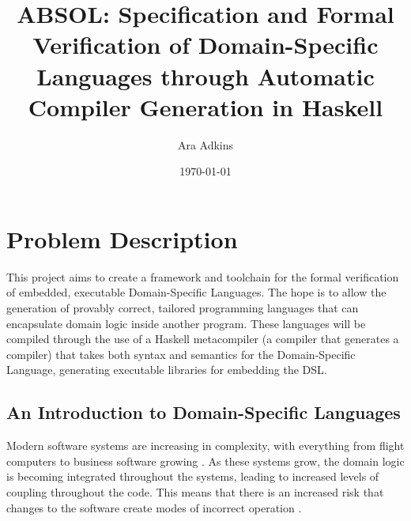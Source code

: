 \documentclass[a4paper,11pt]{report}
\title{ABSOL: Specification and Formal Verification of Domain-Specific Languages through Automatic Compiler Generation in Haskell}
\author{Ara Adkins}
\date{\today}
\begin{document}
\maketitle

\tableofcontents

\printglossaries

\chapter{Problem Description} %
\label{cha:problem_description}
This project aims to create a framework and toolchain for the formal verification of embedded, executable Domain-Specific Languages.
The hope is to allow the generation of provably correct, tailored programming languages that can encapsulate domain logic inside another program.
These languages will be compiled through the use of a Haskell metacompiler (a compiler that generates a compiler) that takes both syntax and semantics for the Domain-Specific Language, generating executable libraries for embedding the DSL.

\section{An Introduction to Domain-Specific Languages} %
\label{sec:an_introduction_to_domain_specific_languages}
Modern software systems are increasing in complexity, with everything from flight computers to business software growing \citep{dvorak2009nasa}.
As these systems grow, the domain logic is becoming integrated throughout the systems, leading to increased levels of coupling throughout the code.
This means that there is an increased risk that changes to the software create modes of incorrect operation \citep{khawar2001developing}.\\
\end{document}
